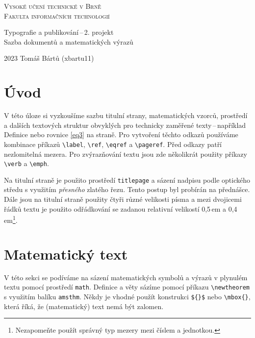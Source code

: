 \documentclass[a4paper,twocolumn,11pt]{article}[06-03-2022]
\theoremstyle{definition}
\begin{document}
\begin{titlepage}
    \begin{center}
        {\Huge \textsc{Vysoké učení technické v Brně} \\
        \vspace{0.5em}
        \huge\textsc{Fakulta informačních technologií}}
        

        {\LARGE Typografie a publikování\,--\,2. projekt \\
        \vspace{0.4em}
        Sazba dokumentů a matematických výrazů}
        
    \end{center}
    { \Large 2023 \hfill Tomáš Bártů (xbartu11) }    
\end{titlepage}


\section*{Úvod}
V této úloze si vyzkoušíme sazbu titulní strany, matematických vzorců, prostředí a dalších textových struktur obvyklých pro technicky zaměřené texty\,--\,například Definice nebo rovnice \eqref{eq3} na straně. 
Pro vytvoření těchto odkazů používáme kombinace příkazů \verb|\label|, \verb|\ref|, \verb|\eqref| a \verb|\pageref|.
Před odkazy patří nezlomitelná mezera.
Pro zvýrazňování textu jsou zde několikrát použity příkazy \verb|\verb| a \verb|\emph|. 

Na titulní straně je použito prostředí \texttt{titlepage} a sázení nadpisu podle optického středu s využitím \emph{přesného} zlatého řezu. 
Tento postup byl probírán na přednášce. 
Dále jsou na titulní straně použity čtyři různé velikosti písma a mezi dvojicemi řádků textu je použito odřádkování se zadanou relativní velikostí 0,5\,em a 0,4\,em\footnote{Nezapomeňte použít správný typ mezery mezi číslem a jednotkou.}.

\section{Matematický text}
V této sekci se podíváme na sázení matematických symbolů a výrazů v plynulém textu pomocí prostředí \texttt{math}.
Definice a věty sázíme pomocí příkazu \verb|\newtheorem| s využitím balíku \texttt{amsthm}.
Někdy je vhodné použít konstrukci \verb|${}$| nebo \verb|\mbox{}|, která říká, že (matematický) text nemá být zalomen.
\end{document}
